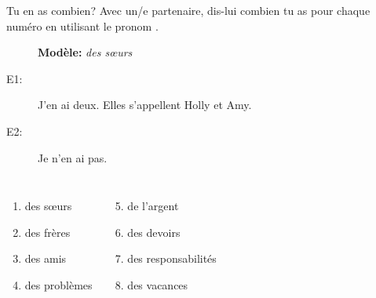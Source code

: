 \begin{frame}{Tu en as combien?}
  Avec un/e partenaire, dis-lui combien tu as pour chaque numéro en utilisant le pronom . \\
  \begin{description}
    \item[] \textbf{Modèle:} \emph{des sœurs}
    \item[E1:] J'en ai deux. Elles s'appellent Holly et Amy.
    \item[E2:] Je n'en ai pas.
  \end{description}
  \begin{columns}
      \begin{enumerate}
        \item des sœurs
        \item des frères
        \item des amis
        \item des problèmes
      \end{enumerate}
      \begin{enumerate}
        \setcounter{enumi}{4}
        \item de l'argent
        \item des devoirs
        \item des responsabilités
        \item des vacances
      \end{enumerate}
  \end{columns}
\end{frame}